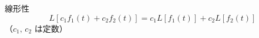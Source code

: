 \begin{frame}{線形性}
  \[
    L[c_{1}f_{1}(t) + c_{2}f_{2}(t)] = c_{1}L[f_{1}(t)] + c_{2}L[f_{2}(t)]
  \]
  {\small （$c_1,\, c_2$ は定数）}
\end{frame}

